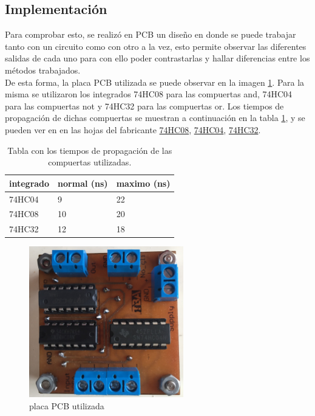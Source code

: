\subsection{Implementaci\'on}
%
\noindent
Para comprobar esto, se realiz\'o en PCB un diseño en donde se puede trabajar tanto con un circuito como con otro a la vez, esto permite observar las diferentes salidas de cada uno para con ello poder contrastarlas y hallar diferencias entre los métodos trabajados.\\
\noindent
De esta forma, la placa PCB utilizada se puede observar en la imagen \ref{ej3_placa}.
Para la misma se utilizaron los integrados 74HC08 para las compuertas and, 74HC04 para las compuertas not y 74HC32 para las compuertas or. Los tiempos de propagación de dichas compuertas se muestran a continuación en la tabla \ref{tabla_comp_tiempos_prop}, y se pueden ver en en las hojas del fabricante \href{ http://www.ti.com/lit/ds/symlink/sn74hc08.pdf}{74HC08}, \href{http://www.ti.com/lit/ds/symlink/sn74hc04.pdf}{74HC04}, \href{http://www.ti.com/lit/ds/symlink/sn74hc32.pdf}{74HC32}.
%
\begin{table}[H]
\caption{Tabla con los tiempos de propagación de las compuertas utilizadas.}
\label{tabla_comp_tiempos_prop}
\centering
\begin{tabular}{|l||l|l|}
\hline
integrado & normal (ns) & maximo (ns) \\ \hline \hline
74HC04    & 9      & 22     \\ \hline
74HC08    & 10     & 20     \\ \hline
74HC32    & 12     & 18     \\ \hline
\end{tabular}
\end{table}
%
%
%
\begin{figure}[H]
    \centering
        \centering
        \includegraphics[width=0.6\textwidth]{figs/Ej3/Circuito_PCB.jpg} %
         \caption{placa PCB utilizada}
         \label{ej3_placa}
\end{figure}
%
